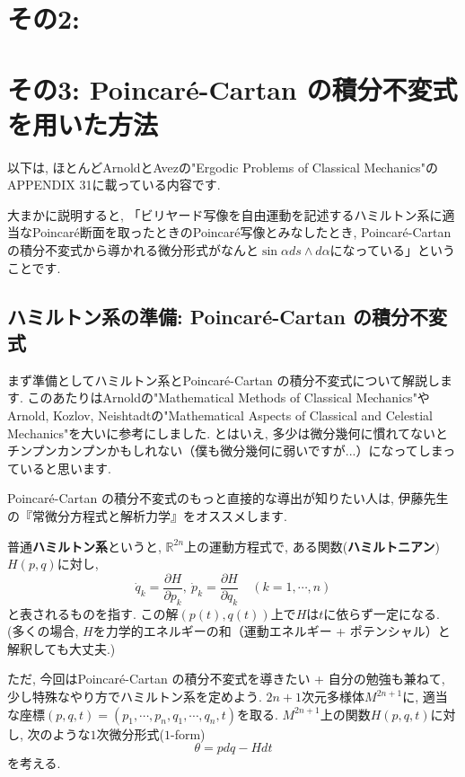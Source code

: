 \documentclass[a4paper]{ujarticle}
\numberwithin{equation}{section}
\theoremstyle{definition}
\begin{document}
    \section{その2: }


\section{その3: Poincar\'{e}-Cartan の積分不変式を用いた方法}

    以下は, ほとんどArnoldとAvezの"Ergodic Problems of Classical Mechanics"\cite{ArnoldAvez}のAPPENDIX 31に載っている内容です. 
    
    大まかに説明すると, 「ビリヤード写像を自由運動を記述するハミルトン系に適当なPoincar\'{e}断面を取ったときのPoincar\'{e}写像とみなしたとき, 
    Poincar\'{e}-Cartan の積分不変式から導かれる微分形式がなんと$\sin{\alpha} d s \wedge d \alpha$になっている」ということです.
    
    \subsection{ハミルトン系の準備: Poincar\'{e}-Cartan の積分不変式}
    まず準備としてハミルトン系とPoincar\'{e}-Cartan の積分不変式について解説します.
    このあたりはArnoldの"Mathematical Methods of Classical Mechanics"や
    Arnold, Kozlov, Neishtadtの"Mathematical Aspects of Classical and Celestial Mechanics"を大いに参考にしました.
    とはいえ, 多少は微分幾何に慣れてないとチンプンカンプンかもしれない（僕も微分幾何に弱いですが...）になってしまっていると思います. 

    Poincar\'{e}-Cartan の積分不変式のもっと直接的な導出が知りたい人は, 
    伊藤先生の『常微分方程式と解析力学』をオススメします.

    \vspace{\baselineskip}

    普通\textbf{ハミルトン系}というと, 
    $\mathbb{R}^{2n}$上の運動方程式で, ある関数(\textbf{ハミルトニアン})$H(p, q)$に対し, 
    \begin{equation} \label{ham}
        \dot{q}_{k} = \frac{\partial H}{\partial p_k}, \ \dot{p}_{k} = \frac{\partial H}{\partial q_k} \quad (k = 1, \cdots, n)
    \end{equation}
    と表されるものを指す.
    この解$(p(t), q(t))$上で$H$は$t$に依らず一定になる. 
    (多くの場合, $H$を力学的エネルギーの和（運動エネルギー + ポテンシャル）と解釈しても大丈夫.)

    ただ, 今回はPoincar\'{e}-Cartan の積分不変式を導きたい + 自分の勉強も兼ねて,
    少し特殊なやり方でハミルトン系を定めよう.
    \vspace{\baselineskip}
    $2n + 1$次元多様体$M^{2n + 1}$に, 適当な座標$(p, q, t) = (p_1, \cdots, p_n, q_1, \cdots, q_n, t)$を取る.
    $M^{2n + 1}$上の関数$H(p, q, t)$に対し, 
    次のような$1$次微分形式($1$-form)
    \begin{equation} \label{PC}
        \theta = p dq - H dt 
    \end{equation}
    を考える. 
\end{document}
